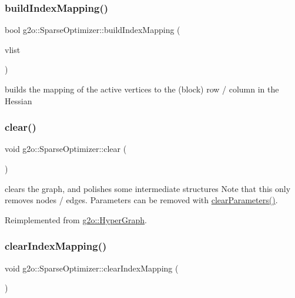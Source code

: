 \subsubsection{\texorpdfstring{build\+Index\+Mapping()}{buildIndexMapping()}}
{\footnotesize\ttfamily bool g2o\+::\+Sparse\+Optimizer\+::build\+Index\+Mapping (\begin{DoxyParamCaption}\item[{\mbox{\hyperlink{classg2o_1_1_hyper_graph_a9339534c99300a0ddac87ba976ef188c}{Sparse\+Optimizer\+::\+Vertex\+Container}} \&}]{vlist }\end{DoxyParamCaption})\hspace{0.3cm}{\ttfamily [protected]}}

builds the mapping of the active vertices to the (block) row / column in the Hessian \mbox{\label{classg2o_1_1_sparse_optimizer_a4881e4ac9ba9a58d4e249dc03ef9683d}} 
\subsubsection{\texorpdfstring{clear()}{clear()}}
{\footnotesize\ttfamily void g2o\+::\+Sparse\+Optimizer\+::clear (\begin{DoxyParamCaption}{ }\end{DoxyParamCaption})\hspace{0.3cm}{\ttfamily [virtual]}}

clears the graph, and polishes some intermediate structures Note that this only removes nodes / edges. Parameters can be removed with \mbox{\hyperlink{structg2o_1_1_optimizable_graph_a15171b6d335115858e2e86dcf576ba78}{clear\+Parameters()}}. 

Reimplemented from \mbox{\hyperlink{classg2o_1_1_hyper_graph_a6b629dff2928dbd704ca81f24858e72f}{g2o\+::\+Hyper\+Graph}}.

\mbox{\label{classg2o_1_1_sparse_optimizer_ab6f1f4ad2b1fd50b8019c6abb89ac6a8}} 
\subsubsection{\texorpdfstring{clear\+Index\+Mapping()}{clearIndexMapping()}}
{\footnotesize\ttfamily void g2o\+::\+Sparse\+Optimizer\+::clear\+Index\+Mapping (\begin{DoxyParamCaption}{ }\end{DoxyParamCaption})\hspace{0.3cm}{\ttfamily [protected]}}

